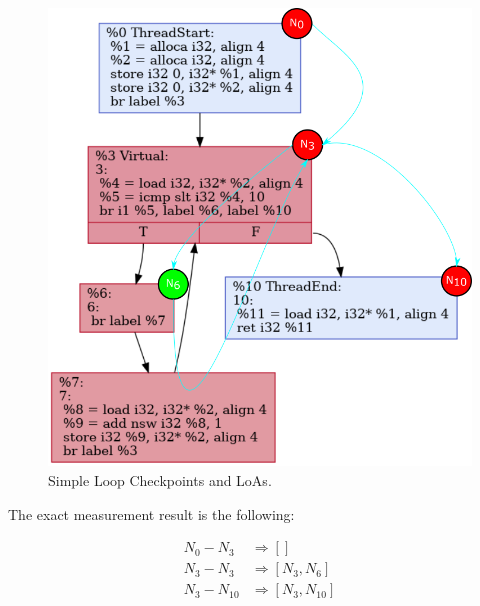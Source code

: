 \begin{figure}[htbp]
    \centerline{\includegraphics[scale=.75]{Figures/05/simple-loop-loa.png}}
    \caption{Simple Loop Checkpoints and LoAs.} 
    \label{fig:simple-loop-loa}
\end{figure}

The exact measurement result is the following:

\begin{align*}  
    N_0 - N_3 &\Rightarrow [] \\
    N_3 - N_3 &\Rightarrow [N_3, N_6] \\
    N_3 - N_{10} &\Rightarrow [N_3, N_{10}] \\
\end{align*}